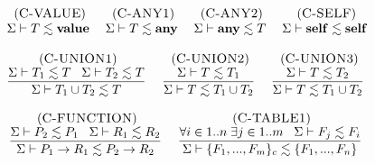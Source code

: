 \begin{figure}[!ht]
\begin{footnotesize}
$$\begin{array}{c}
\;
\begin{array}{c}
\mylabel{C-VALUE}\\
\senv \vdash T \lesssim \Value
\end{array}
\;
\begin{array}{c}
\mylabel{C-ANY1}\\
\senv \vdash T \lesssim \Any
\end{array}
\;
\begin{array}{c}
\mylabel{C-ANY2}\\
\senv \vdash \Any \lesssim T
\end{array}
\;
\begin{array}{c}
\mylabel{C-SELF}\\
\senv \vdash \Self \lesssim \Self
\end{array}
\\ \\
\begin{array}{c}
\mylabel{C-UNION1}\\
\dfrac{\senv \vdash T_{1} \lesssim T \;\;\;
       \senv \vdash T_{2} \lesssim T}
      {\senv \vdash T_{1} \cup T_{2} \lesssim T}
\end{array}
\;
\begin{array}{c}
\mylabel{C-UNION2}\\
\dfrac{\senv \vdash T \lesssim T_{1}}
      {\senv \vdash T \lesssim T_{1} \cup T_{2}}
\end{array}
\;
\begin{array}{c}
\mylabel{C-UNION3}\\
\dfrac{\senv \vdash T \lesssim T_{2}}
      {\senv \vdash T \lesssim T_{1} \cup T_{2}}
\end{array}
\\ \\
\begin{array}{c}
\mylabel{C-FUNCTION}\\
\dfrac{\senv \vdash P_{2} \lesssim P_{1} \;\;\;
       \senv \vdash R_{1} \lesssim R_{2}}
      {\senv \vdash P_{1} \rightarrow R_{1} \lesssim P_{2} \rightarrow R_{2}}
\end{array}
\;
\begin{array}{c}
\mylabel{C-TABLE1}\\
\dfrac{\forall i \in 1..n \; \exists j \in 1..m \;\;\;
       \senv \vdash F_{j} \lesssim F_{i}}
      {\senv \vdash \{F_{1}, ..., F_{m}\}_{c} \lesssim \{F_{1}, ..., F_{n}\}}
\end{array}
\\ \\
\begin{array}{c}

\end{array}
\end{array}$$
\end{footnotesize}
\end{figure}
